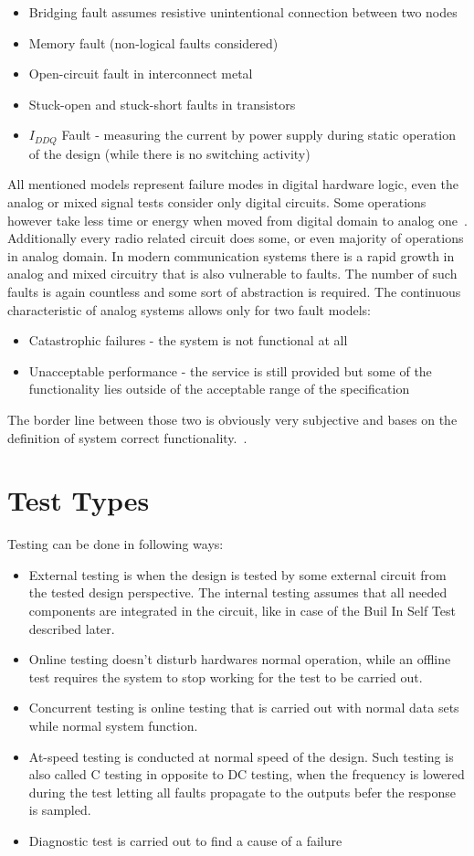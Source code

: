 \begin{itemize}
    \item Bridging fault assumes resistive unintentional connection between two nodes
    \item Memory fault (non-logical faults considered)
    \item Open-circuit fault in interconnect metal
    \item Stuck-open and stuck-short faults in transistors
    \item $I_{DDQ}$ Fault - measuring the current by power supply during static operation of the design (while there is no switching activity)
\end{itemize}
All mentioned models represent failure modes in digital hardware logic, even the analog or mixed signal tests consider only digital circuits. Some operations however take less time or energy when moved from digital domain to analog one~\cite{Prof Vierhaus Lectures}. Additionally every radio related circuit does some, or even majority of operations in analog domain. In modern communication systems there is a rapid growth in analog and mixed circuitry that is also vulnerable to faults. The number of such faults is again countless and some sort of abstraction is required. The continuous characteristic of analog systems allows only for two fault models:
\begin{itemize}
    \item Catastrophic failures - the system is not functional at all
    \item Unacceptable performance - the service is still provided but some of the functionality lies outside of the acceptable range of the specification
\end{itemize}
The border line between those two is obviously very subjective and bases on the definition of system correct functionality.~\cite{book:Kabisatpathy}.
\section{Test Types}
Testing can be done in following ways:
\begin{itemize}
    \item External testing is when the design is tested by some external circuit from the tested design perspective. The internal testing assumes that all needed components are integrated in the circuit, like in case of the Buil In Self Test described later.
    \item Online testing doesn't disturb hardwares normal operation, while an offline test requires the system to stop working for the test to be carried out.
    \item Concurrent testing is online testing that is carried out with normal data sets while normal system function.
    \item At-speed testing is conducted at normal speed of the design. Such testing is also called C testing in opposite to DC testing, when the frequency is lowered during the test letting all faults propagate to the outputs befer the response is sampled.
    \item Diagnostic test is carried out to find a cause of a failure
\end{itemize}

